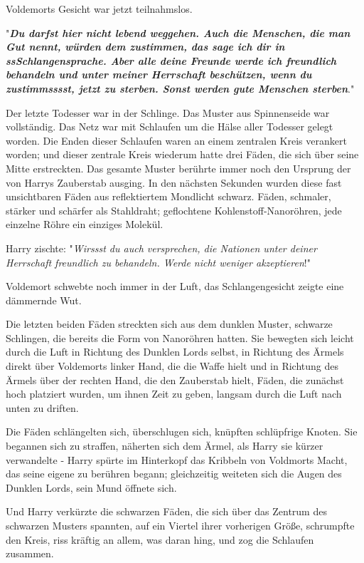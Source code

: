 {Voldemorts Gesicht war jetzt teilnahmslos.

"\textbf{\emph{Du darfst hier nicht lebend weggehen. Auch die Menschen, die man Gut nennt, würden dem zustimmen, das sage ich dir in ssSchlangensprache. Aber alle deine Freunde werde ich freundlich behandeln und unter meiner Herrschaft beschützen, wenn du zustimmsssst, jetzt zu sterben. Sonst werden gute Menschen sterben}}."

Der letzte Todesser war in der Schlinge. Das Muster aus Spinnenseide war vollständig. Das Netz war mit Schlaufen um die Hälse aller Todesser gelegt worden. Die Enden dieser Schlaufen waren an einem zentralen Kreis verankert worden; und dieser zentrale Kreis wiederum hatte drei Fäden, die sich über seine Mitte erstreckten. Das gesamte Muster berührte immer noch den Ursprung der von Harrys Zauberstab ausging. In den nächsten Sekunden wurden diese fast unsichtbaren Fäden aus reflektiertem Mondlicht schwarz. Fäden, schmaler, stärker und schärfer als Stahldraht; geflochtene Kohlenstoff-Nanoröhren, jede einzelne Röhre ein einziges Molekül.

Harry zischte: "\emph{Wirssst du auch versprechen, die Nationen unter deiner Herrschaft freundlich zu behandeln. Werde nicht weniger akzeptieren}!"

Voldemort schwebte noch immer in der Luft, das Schlangengesicht zeigte eine dämmernde Wut.

Die letzten beiden Fäden streckten sich aus dem dunklen Muster, schwarze Schlingen, die bereits die Form von Nanoröhren hatten. Sie bewegten sich leicht durch die Luft in Richtung des Dunklen Lords selbst, in Richtung des Ärmels direkt über Voldemorts linker Hand, die die Waffe hielt und in Richtung des Ärmels über der rechten Hand, die den Zauberstab hielt, Fäden, die zunächst hoch platziert wurden, um ihnen Zeit zu geben, langsam durch die Luft nach unten zu driften.

Die Fäden schlängelten sich, überschlugen sich, knüpften schlüpfrige Knoten. Sie begannen sich zu straffen, näherten sich dem Ärmel, als Harry sie kürzer verwandelte - Harry spürte im Hinterkopf das Kribbeln von Voldmorts Macht, das seine eigene zu berühren begann; gleichzeitig weiteten sich die Augen des Dunklen Lords, sein Mund öffnete sich.

Und Harry verkürzte die schwarzen Fäden, die sich über das Zentrum des schwarzen Musters spannten, auf ein Viertel ihrer vorherigen Größe, schrumpfte den Kreis, riss kräftig an allem, was daran hing, und zog die Schlaufen zusammen.

}
